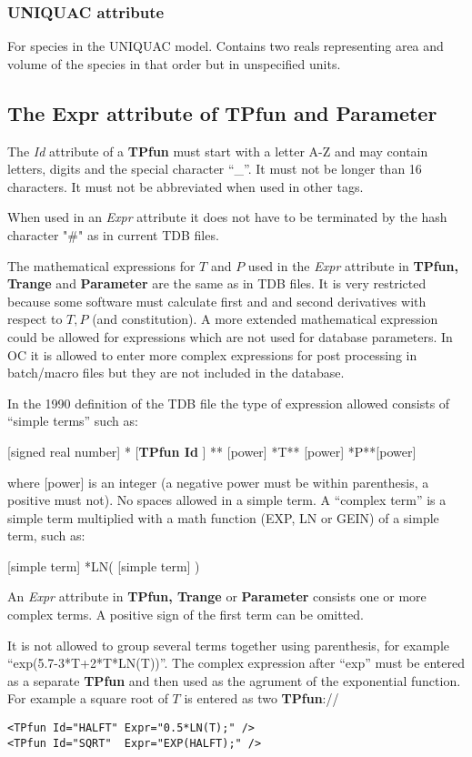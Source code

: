 \documentclass{article}
\begin{document}
\subsubsection{UNIQUAC attribute}\label{sec:uniquac}

For species in the UNIQUAC model.  Contains two reals representing
area and volume of the species in that order but in unspecified units.

\subsection{The Expr attribute of TPfun and Parameter}\label{sec:tpfunattr}\label{sec:expr}

The {\em Id} attribute of a {\bf TPfun} must start with a letter A-Z
and may contain letters, digits and the special character ``\_''.  It
must not be longer than 16 characters.  It must not be abbreviated
when used in other tags.

When used in an {\em Expr} attribute it does not have to be terminated
by the hash character "\#" as in current TDB files.

The mathematical expressions for $T$ and $P$ used in the {\em Expr}
attribute in {\bf TPfun, Trange} and {\bf Parameter} are the same as
in TDB files.  It is very restricted because some software must
calculate first and and second derivatives with respect to $T, P$ (and
constitution).  A more extended mathematical expression could be
allowed for expressions which are not used for database parameters.
In OC it is allowed to enter more complex expressions for post
processing in batch/macro files but they are not included in the
database.

In the 1990 definition of the TDB file the type of expression allowed
consists of ``simple terms'' such as:

[signed real number] * [{\bf TPfun Id} ] ** [power] *T** [power] *P**[power]

where [power] is an integer (a negative power must be within
parenthesis, a positive must not).  No spaces allowed in a simple
term.  A ``complex term'' is a simple term multiplied with a math
function (EXP, LN or GEIN) of a simple term, such as:

[simple term] *LN( [simple term] )

An {\em Expr} attribute in {\bf TPfun, Trange} or {\bf Parameter}
consists one or more complex terms.  A positive sign of the first term
can be omitted.
  
It is not allowed to group several terms together using parenthesis,
for example ``exp(5.7-3*T+2*T*LN(T))''.  The complex expression after
``exp'' must be entered as a separate {\bf TPfun} and then used as the
agrument of the exponential function.  For example a square root of
$T$ is entered as two {\bf TPfun}://
\begin{verbatim}
<TPfun Id="HALFT" Expr="0.5*LN(T);" />
<TPfun Id="SQRT"  Expr="EXP(HALFT);" />
\end{verbatim}
\end{document}
